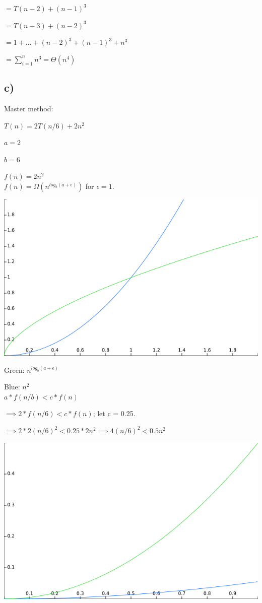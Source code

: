 \documentclass[10pt,a4paper]{report}
\begin{document}
	$		= T(n-2) + (n-1)^3$
	
	$		= T(n-3) + (n-2)^3$
	
	$		= 1 + ... + (n-2)^3 + (n-1)^3 + n^3$
	
	$		= \sum_{i=1}^{n} n^3 = \Theta(n^4)$
	
	\newpage
	\subsection*{c)}
	Master method:
	
	$T(n) = 2T(n/6) + 2n^2$
	
	$a = 2$
	
	$b = 6$
	
	$f(n) = 2n^2$
	\\
	
	$f(n) = \Omega(n^{log_b(a+\epsilon)})$ for $\epsilon = 1$.
	
	\includegraphics*[scale=0.5]{1c}
	
	Green: $n^{log_b(a+\epsilon)}$
	
	Blue: $n^2$
	\\
	
	$a*f(n/b) < c*f(n)$
	
	$\implies 2*f(n/6) < c*f(n)$; let c = 0.25.
	
	$\implies 2*2(n/6)^2 < 0.25*2n^2 \implies 4(n/6)^2 < 0.5n^2$
	
	\includegraphics*[scale=0.5]{1c2}
	
\end{document}
